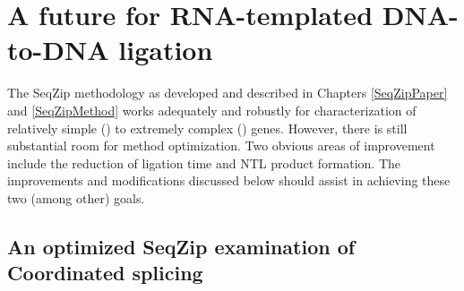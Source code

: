 

\section{A future for RNA-templated DNA-to-DNA ligation}
  \label{Disc:sec:SeqZip Improvements}

  The SeqZip methodology as developed and described in Chapters \ref{SeqZipPaper} and \ref{SeqZipMethod} works adequately and robustly for characterization of relatively simple (\cd{}) to extremely complex (\dscam{}) genes. However, there is still substantial room for method optimization. Two obvious areas of improvement include the reduction of ligation time and NTL product formation. The improvements and modifications discussed below should assist in achieving these two (among other) goals.

  \subsection{An optimized SeqZip examination of Coordinated splicing}
    \label{Disc:subsec: Ideal SeqZip exp. to look for Coordination}

